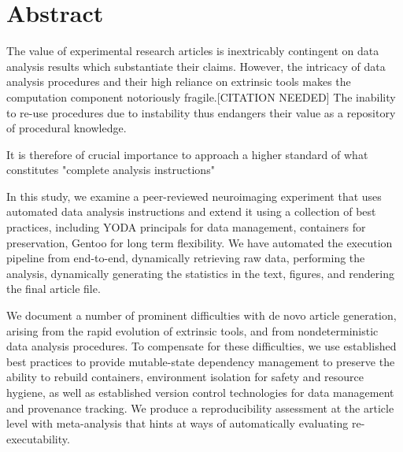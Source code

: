 \section{Abstract}

The value of experimental research articles is inextricably contingent on data analysis results which substantiate their claims.
However, the intricacy of data analysis procedures and their high reliance on extrinsic tools makes the computation component notoriously fragile.[CITATION NEEDED]
The inability to re-use procedures due to instability thus endangers their value as a repository of procedural knowledge.

It is therefore of crucial importance to approach a higher standard of what constitutes "complete analysis instructions"

In this study, we examine a peer-reviewed neuroimaging experiment that uses automated data analysis instructions and extend it using a collection of best practices, including YODA principals for data management, containers for preservation, Gentoo for long term flexibility.
We have automated the execution pipeline from end-to-end, dynamically retrieving raw data, performing the analysis, dynamically generating the statistics in the text, figures, and rendering the final article file. 

We document a number of prominent difficulties with de novo article generation, arising from the rapid evolution of extrinsic tools, and from nondeterministic data analysis procedures.
To compensate for these difficulties, we use established best practices to provide mutable-state dependency management to preserve the ability to rebuild containers, environment isolation for safety and resource hygiene, as well as established version control technologies for data management and provenance tracking.
We produce a reproducibility assessment at the article level with meta-analysis that hints at ways of automatically evaluating re-executability.

